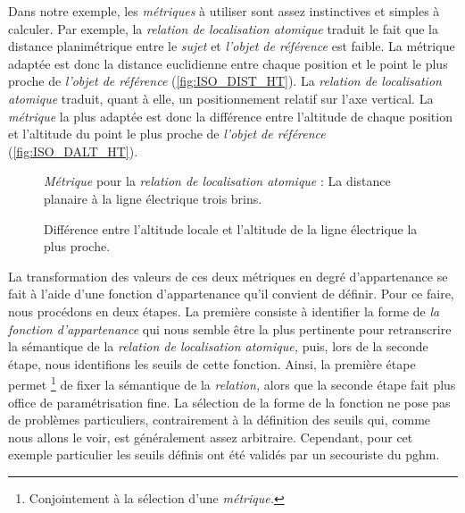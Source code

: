 Dans notre exemple, les \emph{métriques} à utiliser sont assez
instinctives et simples à calculer. Par exemple, la \emph{relation de
  localisation atomique}  traduit le fait que la
distance planimétrique entre le \emph{sujet} et \emph{l'objet de
  référence} est faible. La métrique adaptée est donc la distance
euclidienne entre chaque position et le point le plus proche de
\emph{l'objet de référence} (\autoref{fig:ISO_DIST_HT}). La
\emph{relation de localisation atomique}
 traduit,
quant à elle, un positionnement relatif sur l'axe vertical. La
\emph{métrique} la plus adaptée est donc la différence entre
l'altitude de chaque position et l'altitude du point le plus proche de
\emph{l'objet de référence} (\autoref{fig:ISO_DALT_HT}).

\begin{figure}
  \centering
  
  \caption{\emph{Métrique} pour la \emph{relation de localisation
      atomique}
    \protect{}
    : La distance planaire à la ligne électrique trois brins.}
  \label{fig:ISO_DIST_HT}
\end{figure}

\begin{figure}
  \centering
  
  \caption{Différence entre l'altitude locale et l'altitude de la
    ligne électrique la plus proche.}
  \label{fig:ISO_DALT_HT}
\end{figure}

La transformation des valeurs de ces deux métriques en degré
d'appartenance se fait à l'aide d'une fonction d'appartenance qu'il
convient de définir. Pour ce faire, nous procédons en deux étapes. La
première consiste à identifier la forme de \emph{la fonction
  d'appartenance} qui nous semble être la plus pertinente pour
retranscrire la sémantique de la \emph{relation de localisation
  atomique,} puis, lors de la seconde étape, nous identifions les
seuils de cette fonction. Ainsi, la première étape permet
\footnote{Conjointement à la sélection d'une \emph{métrique.}} de
fixer la sémantique de la \emph{relation,} alors que la seconde étape
fait plus office de paramétrisation fine. La sélection de la forme de
la fonction ne pose pas de problèmes particuliers, contrairement à la
définition des seuils qui, comme nous allons le voir, est généralement
assez arbitraire. Cependant, pour cet exemple particulier les seuils
définis ont été validés par un secouriste du \ac{pghm}.

